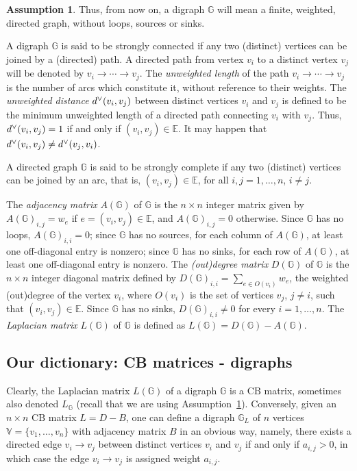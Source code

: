 \documentclass[10pt]{amsart}
\newcommand{\mbg}{\mbox{$\mathbb{G}$}}
\newcommand{\mbv}{\mbox{$\mathbb{V}$}}
\newcommand{\mbe}{\mbox{$\mathbb{E}$}}
\newcommand{\cb}{\mbox{$\mathrm{CB}$}}
\newcommand{\ud}{\mbox{${\rm d}^\vee$}}
\theoremstyle{definition}
\newtheorem{assumption}[cdrthm]{Assumption}
\theoremstyle{remark}
\begin{document}
\begin{assumption}\label{digraph}
Thus, from now on, a digraph $\mbg$ will mean a finite, weighted,
directed graph, without loops, sources or sinks.
\end{assumption}

A digraph $\mbg$ is said to be strongly connected if any two
(distinct) vertices can be joined by a (directed) path. A directed
path from vertex $v_i$ to a distinct vertex $v_j$ will be denoted by
$v_i\to\cdots\to v_j$. The {\em unweighted length} of the path
$v_i\to\cdots\to v_j$ is the number of arcs which constitute it,
without reference to their weights.  The {\em unweighted distance}
$\ud(v_i,v_j)$ between distinct vertices $v_i$ and $v_j$ is defined to
be the minimum unweighted length of a directed path connecting $v_i$
with $v_j$. Thus, $\ud(v_i,v_j)=1$ if and only if $(v_i,v_j)\in\mbe$.
It may happen that $\ud(v_i,v_j)\neq \ud(v_j,v_i)$.

A directed graph $\mbg$ is said to be strongly complete if any two
(distinct) vertices can be joined by an arc, that is, $(v_i,v_j)\in
\mbe$, for all $i,j=1,\ldots ,n$, $i\neq j$.

The {\em adjacency matrix} $A(\mbg)$ of $\mbg$ is the $n\times n$
integer matrix given by $A(\mbg)_{i,j}=w_e$ if $e=(v_i,v_j)\in \mbe$,
and $A(\mbg)_{i,j}=0$ otherwise. Since $\mbg$ has no loops,
$A(\mbg)_{i,i}=0$; since $\mbg$ has no sources, for each column of
$A(\mbg)$, at least one off-diagonal entry is nonzero; since $\mbg$
has no sinks, for each row of $A(\mbg)$, at least one off-diagonal
entry is nonzero. The {\em (out)degree matrix} $D(\mbg)$ of $\mbg$ is
the $n\times n$ integer diagonal matrix defined by
$D(\mbg)_{i,i}=\sum_{e\in O(v_i)}w_e$, the weighted (out)degree of the
vertex $v_i$, where $O(v_i)$ is the set of vertices $v_j$, $j\neq i$,
such that $(v_i,v_j)\in \mbe$. Since $\mbg$ has no sinks,
$D(\mbg)_{i,i}\neq 0$ for every $i=1,\ldots, n$. The {\em Laplacian
  matrix} $L(\mbg)$ of $\mbg$ is defined as $L(\mbg)=D(\mbg)-A(\mbg)$.

\subsection{Our dictionary: CB matrices - digraphs}\label{dictionary}

Clearly, the Laplacian matrix $L(\mbg)$ of a digraph $\mbg$
is a $\cb$ matrix, sometimes also denoted $L_{\mathbb{G}}$ (recall
that we are using Assumption~\ref{digraph}). Conversely, given an
$n\times n$ $\cb$ matrix $L=D-B$, one can define a digraph $\mbg_L$ of
$n$ vertices $\mbv=\{v_1,\ldots ,v_n\}$ with adjacency matrix $B$ in
an obvious way, namely, there exists a directed edge $v_i\to v_j$
between distinct vertices $v_i$ and $v_j$ if and only if $a_{i,j}>0$,
in which case the edge $v_i\to v_j$ is assigned weight $a_{i,j}$.
\end{document}
